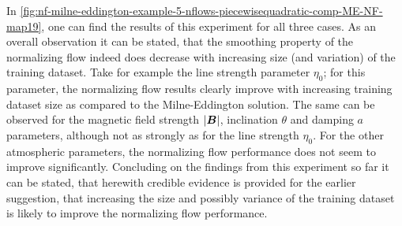 \documentclass[a4paper,12pt]{report}
\def\lk#1{{\color{black}{#1}}}
\begin{document}
In \cref{fig:nf-milne-eddington-example-5-nflows-piecewisequadratic-comp-ME-NF-map19}, one can find the results of this experiment for all three cases. As an overall observation it can be stated, that the smoothing property of the normalizing flow indeed does decrease with increasing size (and variation) of the training dataset. Take for example the line strength parameter $\eta_0$; for this parameter, the normalizing flow results clearly improve with increasing training dataset size as compared to the Milne-Eddington solution. The same can be observed for the magnetic field strength $|\bm{B}|$, inclination $\theta$ and damping $a$ parameters, although not as strongly as for the line strength $\eta_0$. For the other atmospheric parameters, the normalizing flow performance does not seem to improve significantly. Concluding on the findings from this experiment so far it can be stated, that herewith credible evidence is provided for the earlier suggestion, that increasing the size and possibly \lk{also the} variance of the training dataset is likely to improve the normalizing flow performance.
\end{document}
